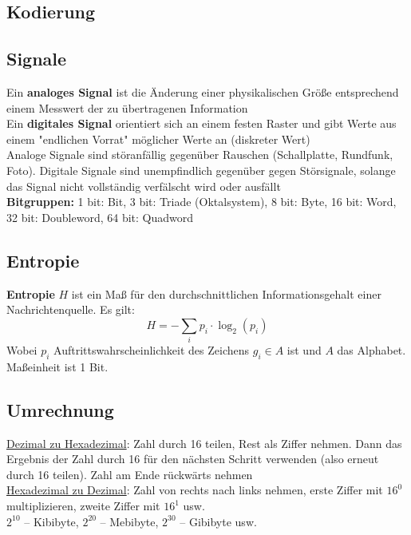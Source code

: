 \documentclass[12pt,landscape]{article}
\begin{document}
\begin{multicols}{3}
\section{Kodierung}
\subsection{Signale}
Ein \textbf{analoges Signal} ist die Änderung einer physikalischen Größe entsprechend einem Messwert der zu übertragenen Information\\
Ein \textbf{digitales Signal} orientiert sich an einem festen Raster und gibt Werte aus einem "endlichen Vorrat" möglicher Werte an (diskreter Wert)\\
Analoge Signale sind störanfällig gegenüber Rauschen (Schallplatte, Rundfunk, Foto). Digitale Signale sind unempfindlich gegenüber gegen Störsignale, solange das Signal nicht vollständig verfälscht wird oder ausfällt\\
\textbf{Bitgruppen:} 1 bit: Bit, 3 bit: Triade (Oktalsystem), 8 bit: Byte, 16 bit: Word, 32 bit: Doubleword, 64 bit: Quadword
\subsection{Entropie}
\textbf{Entropie} $H$ ist ein Maß für den durchschnittlichen Informationsgehalt einer Nachrichtenquelle. Es gilt:
\[ H = - \sum_{i}p_i \cdot \log_2(p_i) \]
Wobei $p_i$ Auftrittswahrscheinlichkeit des Zeichens $g_i \in A$ ist und $A$ das Alphabet. Maßeinheit ist 1 Bit.
\subsection{Umrechnung}
\underline{Dezimal zu Hexadezimal}: Zahl durch 16 teilen, Rest als Ziffer nehmen. Dann das Ergebnis der Zahl durch 16 für den nächsten Schritt verwenden (also erneut durch 16 teilen). Zahl am Ende rückwärts nehmen\\
\underline{Hexadezimal zu Dezimal}: Zahl von rechts nach links nehmen, erste Ziffer mit $16^0$ multiplizieren, zweite Ziffer mit $16^1$ usw.\\
$2^{10}$ -- Kibibyte, $2^{20}$ -- Mebibyte, $2^{30}$ -- Gibibyte usw. 

\end{multicols}
\end{document}
